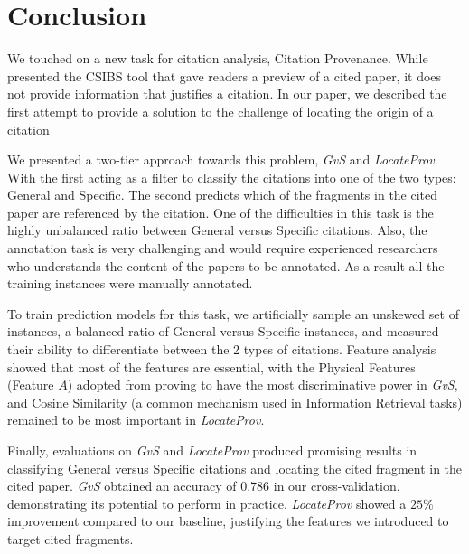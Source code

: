 \chapter{Conclusion}
\label{conclusion}
We touched on a new task for citation analysis, Citation Provenance. While  presented the CSIBS tool that gave readers a preview of a cited paper, it does not provide information that justifies a citation. In our paper, we described the first attempt to provide a solution to the challenge of locating the origin of a citation

We presented a two-tier approach towards this problem, {\it GvS} and {\it LocateProv}. With the first acting as a filter to classify the citations into one of the two types: General and Specific. The second predicts which of the fragments in the cited paper are referenced by the citation. One of the difficulties in this task is the highly unbalanced ratio between General versus Specific citations. Also, the annotation task is very challenging and would require experienced researchers who understands the content of the papers to be annotated. As a result all the training instances were manually annotated.

To train prediction models for this task, we artificially sample an unskewed set of instances, a balanced ratio of General versus Specific instances, and measured their ability to differentiate between the 2 types of citations. Feature analysis showed that most of the features are essential, with the Physical Features (Feature $A$) adopted from  proving to have the most discriminative power in {\it GvS}, and Cosine Similarity (a common mechanism used in Information Retrieval tasks) remained to be most important in {\it LocateProv}.

Finally, evaluations on {\it GvS} and {\it LocateProv} produced promising results in classifying General versus Specific citations and locating the cited fragment in the cited paper. \textit{GvS} obtained an accuracy of 0.786 in our cross-validation, demonstrating its potential to perform in practice. \textit{LocateProv} showed a $25\%$ improvement compared to our baseline, justifying the features we introduced to target cited fragments.
